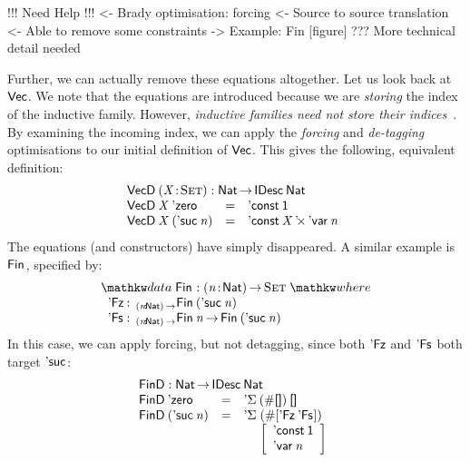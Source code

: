 \begin{wstructure}
!!! Need Help !!!
<- Brady optimisation: forcing
    <- Source to source translation
    <- Able to remove some constraints
    -> Example: Fin [figure]
    ??? More technical detail needed
\end{wstructure}

Further, we can actually remove these equations altogether. Let us
look back at $\D{Vec}$. We note that the equations are introduced
because we are \emph{storing} the index of the inductive family.
However, \emph{inductive families need not store their
  indices}~\cite{brady:index-inductive-families}.  By examining the
incoming index, we can apply the \emph{forcing} and \emph{de-tagging}
optimisations to our initial definition of $\D{Vec}$. This gives the
following, equivalent definition:
%
\[\stk{
\VecD \:\PITEL{\V{X}}{\Set} : \Nat \To \IDesc{\Nat} \\
\begin{array}{@{}lll}
\VecD\:\V{X}\: \NatZero     & = & \DConst{\Unit} \\
\VecD\:\V{X}\: (\NatSuc{\V{n}}) & = & \DProd{\DConst{\V{X}}}{\DVar{\V{n}}}
\end{array}
                                       
}\]
%
The equations (and constructors) have simply disappeared. A similar
example is $\Fin{\!}$, specified by:
%
\[
\stk{
\data \Fin{\!} : \PI{\V{n}}{\Nat} \Set \where \\
\;\;\begin{array}{@{}l@{\::\:\:}l@{\quad}l}
    \FinZero      & _{\PI{\V{n}}{\Nat}}\Fin{(\NatSuc{\V{n}})}   \\
    \FinSuc{\!}   & _{\PI{\V{n}}{\Nat}}\Fin{\V{n}} \To \Fin{(\NatSuc{\V{n}})}
\end{array}
}\]
%
In this case, we can apply forcing, but not detagging, since both
$\FinZero$ and $\FinSuc{\!}$ both target $\NatSuc{\!}$:
%
\[\stk{
\FinD : \Nat \To \IDesc{\Nat} \\
\begin{array}{@{}llll}
\FinD\: \NatZero     & = & \multicolumn{2}{l}{\DSigma{(\EnumT{\Void})}{\Void} } \\
\FinD\: (\NatSuc{\V{n}}) & = & \DSigma{\!}{\!}\!\!\!\!\! & (\EnumT{\sqr{ \FinZero \: \FinSuc{\!} }}) \\
                     &   &             & \bigRedBracket{
                                         \begin{array}{l}
                                         \DConst{\Unit} \\
                                         \DVar{\V{n}}
                                         \end{array}
                                         }
\end{array}
}\]

